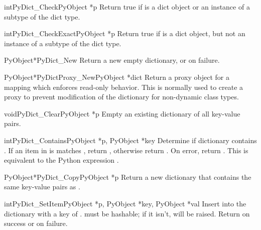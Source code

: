 \begin{cfuncdesc}{int}{PyDict_Check}{PyObject *p}
  Return true if  is a dict object or an instance of a
  subtype of the dict type.
\end{cfuncdesc}

\begin{cfuncdesc}{int}{PyDict_CheckExact}{PyObject *p}
  Return true if  is a dict object, but not an instance of a
  subtype of the dict type.
\end{cfuncdesc}

\begin{cfuncdesc}{PyObject*}{PyDict_New}{}
  Return a new empty dictionary, or \NULL{} on failure.
\end{cfuncdesc}

\begin{cfuncdesc}{PyObject*}{PyDictProxy_New}{PyObject *dict}
  Return a proxy object for a mapping which enforces read-only
  behavior.  This is normally used to create a proxy to prevent
  modification of the dictionary for non-dynamic class types.
\end{cfuncdesc}

\begin{cfuncdesc}{void}{PyDict_Clear}{PyObject *p}
  Empty an existing dictionary of all key-value pairs.
\end{cfuncdesc}

\begin{cfuncdesc}{int}{PyDict_Contains}{PyObject *p, PyObject *key}
  Determine if dictionary  contains .  If an item
  in  is matches , return , otherwise return
  .  On error, return .  This is equivalent to the
  Python expression .
\end{cfuncdesc}

\begin{cfuncdesc}{PyObject*}{PyDict_Copy}{PyObject *p}
  Return a new dictionary that contains the same key-value pairs as
  .
\end{cfuncdesc}

\begin{cfuncdesc}{int}{PyDict_SetItem}{PyObject *p, PyObject *key,
                                       PyObject *val}
  Insert  into the dictionary  with a key of
  .   must be hashable; if it isn't,
   will be raised.
  Return  on success or  on failure.
\end{cfuncdesc}

